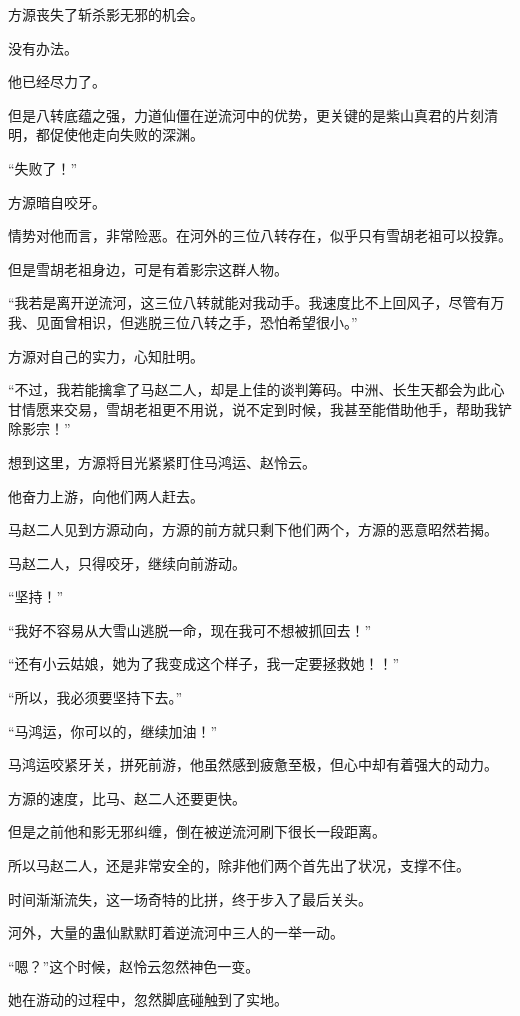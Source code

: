 \begin{this_body}
方源丧失了斩杀影无邪的机会。

没有办法。

他已经尽力了。

但是八转底蕴之强，力道仙僵在逆流河中的优势，更关键的是紫山真君的片刻清明，都促使他走向失败的深渊。

“失败了！”

方源暗自咬牙。

情势对他而言，非常险恶。在河外的三位八转存在，似乎只有雪胡老祖可以投靠。

但是雪胡老祖身边，可是有着影宗这群人物。

“我若是离开逆流河，这三位八转就能对我动手。我速度比不上回风子，尽管有万我、见面曾相识，但逃脱三位八转之手，恐怕希望很小。”

方源对自己的实力，心知肚明。

“不过，我若能擒拿了马赵二人，却是上佳的谈判筹码。中洲、长生天都会为此心甘情愿来交易，雪胡老祖更不用说，说不定到时候，我甚至能借助他手，帮助我铲除影宗！”

想到这里，方源将目光紧紧盯住马鸿运、赵怜云。

他奋力上游，向他们两人赶去。

马赵二人见到方源动向，方源的前方就只剩下他们两个，方源的恶意昭然若揭。

马赵二人，只得咬牙，继续向前游动。

“坚持！”

“我好不容易从大雪山逃脱一命，现在我可不想被抓回去！”

“还有小云姑娘，她为了我变成这个样子，我一定要拯救她！！”

“所以，我必须要坚持下去。”

“马鸿运，你可以的，继续加油！”

马鸿运咬紧牙关，拼死前游，他虽然感到疲惫至极，但心中却有着强大的动力。

方源的速度，比马、赵二人还要更快。

但是之前他和影无邪纠缠，倒在被逆流河刷下很长一段距离。

所以马赵二人，还是非常安全的，除非他们两个首先出了状况，支撑不住。

时间渐渐流失，这一场奇特的比拼，终于步入了最后关头。

河外，大量的蛊仙默默盯着逆流河中三人的一举一动。

“嗯？”这个时候，赵怜云忽然神色一变。

她在游动的过程中，忽然脚底碰触到了实地。


\end{this_body}
